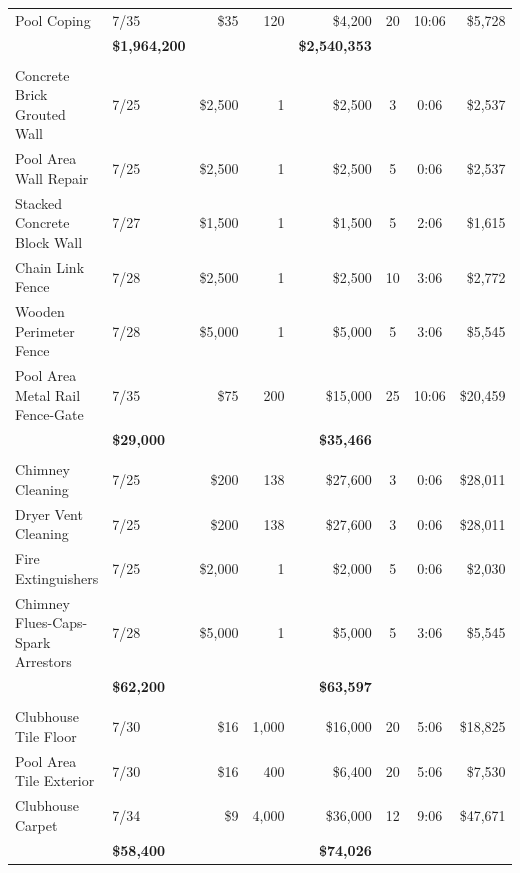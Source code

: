 \documentclass[11pt,letterpaper]{article}
\begin{document}
\begin{longtable}{p{4.2cm} p{1.6cm} r r r c c r}
\rowcolor{blue!12} Pool Coping & 7/35 & \$35 & 120 & \$4,200 & 20 & 10:06 & \$5,728 \\
\addlinespace[1pt] \multicolumn{4}{r}{} & \textbf{\$1,964,200} & & & \textbf{\$2,540,353} \\
\addlinespace[6pt]
\multicolumn{8}{l}{\textbf{Fences-Walls-Gates}} \\
Concrete Brick Grouted Wall & 7/25 & \$2,500 & 1 & \$2,500 & 3 & 0:06 & \$2,537 \\
\rowcolor{blue!12} Pool Area Wall Repair & 7/25 & \$2,500 & 1 & \$2,500 & 5 & 0:06 & \$2,537 \\
Stacked Concrete Block Wall & 7/27 & \$1,500 & 1 & \$1,500 & 5 & 2:06 & \$1,615 \\
\rowcolor{blue!12} Chain Link Fence & 7/28 & \$2,500 & 1 & \$2,500 & 10 & 3:06 & \$2,772 \\
Wooden Perimeter Fence & 7/28 & \$5,000 & 1 & \$5,000 & 5 & 3:06 & \$5,545 \\
\rowcolor{blue!12} Pool Area Metal Rail Fence-Gate & 7/35 & \$75 & 200 & \$15,000 & 25 & 10:06 & \$20,459 \\
\addlinespace[1pt] \multicolumn{4}{r}{} & \textbf{\$29,000} & & & \textbf{\$35,466} \\
\addlinespace[6pt]
\multicolumn{8}{l}{\textbf{Fire Safety}} \\
Chimney Cleaning & 7/25 & \$200 & 138 & \$27,600 & 3 & 0:06 & \$28,011 \\
\rowcolor{blue!12} Dryer Vent Cleaning & 7/25 & \$200 & 138 & \$27,600 & 3 & 0:06 & \$28,011 \\
Fire Extinguishers & 7/25 & \$2,000 & 1 & \$2,000 & 5 & 0:06 & \$2,030 \\
\rowcolor{blue!12} Chimney Flues-Caps-Spark Arrestors & 7/28 & \$5,000 & 1 & \$5,000 & 5 & 3:06 & \$5,545 \\
\addlinespace[1pt] \multicolumn{4}{r}{} & \textbf{\$62,200} & & & \textbf{\$63,597} \\
\addlinespace[6pt]
\multicolumn{8}{l}{\textbf{Flooring}} \\
Clubhouse Tile Floor & 7/30 & \$16 & 1,000 & \$16,000 & 20 & 5:06 & \$18,825 \\
\rowcolor{blue!12} Pool Area Tile Exterior & 7/30 & \$16 & 400 & \$6,400 & 20 & 5:06 & \$7,530 \\
Clubhouse Carpet & 7/34 & \$9 & 4,000 & \$36,000 & 12 & 9:06 & \$47,671 \\
\addlinespace[1pt] \multicolumn{4}{r}{} & \textbf{\$58,400} & & & \textbf{\$74,026} \\

\end{longtable}
\end{document}
